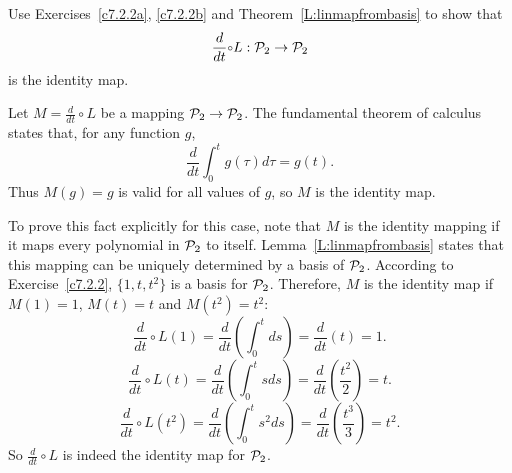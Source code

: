 \documentclass{ximera}
\begin{document}
\begin{exercise}  \label{c7.2.2c}
Use Exercises~\ref{c7.2.2a}, \ref{c7.2.2b} and
Theorem~\ref{L:linmapfrombasis} to show that
\[
\frac{d}{dt}\compose L:{\cal P}_2\to{\cal P}_2
\]
is the identity map.

\begin{solution}

Let $M = \frac{d}{dt} \circ L$ be a mapping ${\cal P}_2
\rightarrow {\cal P}_2$.  The fundamental
theorem of calculus states that, for any function $g$,
\[ \frac{d}{dt}\int_0^t g(\tau)d\tau = g(t). \]
Thus $M(g) = g$ is valid for all values of $g$, so $M$ is the
identity map.

\para To prove this fact explicitly for this case, note that $M$ is
the identity mapping if it maps every polynomial in ${\cal P}_2$ to
itself.  Lemma~\ref{L:linmapfrombasis} states that this mapping can
be uniquely determined by a basis of ${\cal P}_2$.  According to
Exercise~\ref{c7.2.2}, $\{1,t,t^2\}$ is a basis for ${\cal P}_2$. 
Therefore, $M$ is the identity map if $M(1) = 1$, $M(t) = t$ and
$M(t^2) = t^2$:
\[ \frac{d}{dt} \circ L (1) = \frac{d}{dt}\left(\int_0^tds\right) =
\frac{d}{dt}(t) = 1. \]
\[ \frac{d}{dt} \circ L (t) = \frac{d}{dt}\left(\int_0^tsds\right) =
\frac{d}{dt}\left(\frac{t^2}{2}\right) = t. \]
\[ \frac{d}{dt} \circ L (t^2) = \frac{d}{dt}\left(\int_0^ts^2ds\right) =
\frac{d}{dt}\left(\frac{t^3}{3}\right) = t^2. \]
So $\frac{d}{dt} \circ L$ is indeed the identity map for ${\cal P}_2$.

\end{solution}
\end{exercise}
\end{document}
